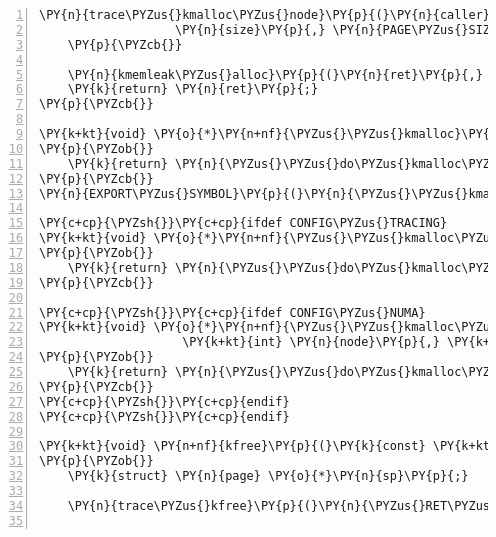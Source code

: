 \begin{Verbatim}[commandchars=\\\{\},numbers=left,firstnumber=1,stepnumber=1]
		\PY{n}{trace\PYZus{}kmalloc\PYZus{}node}\PY{p}{(}\PY{n}{caller}\PY{p}{,} \PY{n}{ret}\PY{p}{,}
				   \PY{n}{size}\PY{p}{,} \PY{n}{PAGE\PYZus{}SIZE} \PY{o}{\PYZlt{}}\PY{o}{\PYZlt{}} \PY{n}{order}\PY{p}{,} \PY{n}{gfp}\PY{p}{,} \PY{n}{node}\PY{p}{)}\PY{p}{;}
	\PY{p}{\PYZcb{}}

	\PY{n}{kmemleak\PYZus{}alloc}\PY{p}{(}\PY{n}{ret}\PY{p}{,} \PY{n}{size}\PY{p}{,} \PY{l+m+mi}{1}\PY{p}{,} \PY{n}{gfp}\PY{p}{)}\PY{p}{;}
	\PY{k}{return} \PY{n}{ret}\PY{p}{;}
\PY{p}{\PYZcb{}}

\PY{k+kt}{void} \PY{o}{*}\PY{n+nf}{\PYZus{}\PYZus{}kmalloc}\PY{p}{(}\PY{k+kt}{size\PYZus{}t} \PY{n}{size}\PY{p}{,} \PY{k+kt}{gfp\PYZus{}t} \PY{n}{gfp}\PY{p}{)}
\PY{p}{\PYZob{}}
	\PY{k}{return} \PY{n}{\PYZus{}\PYZus{}do\PYZus{}kmalloc\PYZus{}node}\PY{p}{(}\PY{n}{size}\PY{p}{,} \PY{n}{gfp}\PY{p}{,} \PY{n}{NUMA\PYZus{}NO\PYZus{}NODE}\PY{p}{,} \PY{n}{\PYZus{}RET\PYZus{}IP\PYZus{}}\PY{p}{)}\PY{p}{;}
\PY{p}{\PYZcb{}}
\PY{n}{EXPORT\PYZus{}SYMBOL}\PY{p}{(}\PY{n}{\PYZus{}\PYZus{}kmalloc}\PY{p}{)}\PY{p}{;}

\PY{c+cp}{\PYZsh{}}\PY{c+cp}{ifdef CONFIG\PYZus{}TRACING}
\PY{k+kt}{void} \PY{o}{*}\PY{n+nf}{\PYZus{}\PYZus{}kmalloc\PYZus{}track\PYZus{}caller}\PY{p}{(}\PY{k+kt}{size\PYZus{}t} \PY{n}{size}\PY{p}{,} \PY{k+kt}{gfp\PYZus{}t} \PY{n}{gfp}\PY{p}{,} \PY{k+kt}{unsigned} \PY{k+kt}{long} \PY{n}{caller}\PY{p}{)}
\PY{p}{\PYZob{}}
	\PY{k}{return} \PY{n}{\PYZus{}\PYZus{}do\PYZus{}kmalloc\PYZus{}node}\PY{p}{(}\PY{n}{size}\PY{p}{,} \PY{n}{gfp}\PY{p}{,} \PY{n}{NUMA\PYZus{}NO\PYZus{}NODE}\PY{p}{,} \PY{n}{caller}\PY{p}{)}\PY{p}{;}
\PY{p}{\PYZcb{}}

\PY{c+cp}{\PYZsh{}}\PY{c+cp}{ifdef CONFIG\PYZus{}NUMA}
\PY{k+kt}{void} \PY{o}{*}\PY{n+nf}{\PYZus{}\PYZus{}kmalloc\PYZus{}node\PYZus{}track\PYZus{}caller}\PY{p}{(}\PY{k+kt}{size\PYZus{}t} \PY{n}{size}\PY{p}{,} \PY{k+kt}{gfp\PYZus{}t} \PY{n}{gfp}\PY{p}{,}
					\PY{k+kt}{int} \PY{n}{node}\PY{p}{,} \PY{k+kt}{unsigned} \PY{k+kt}{long} \PY{n}{caller}\PY{p}{)}
\PY{p}{\PYZob{}}
	\PY{k}{return} \PY{n}{\PYZus{}\PYZus{}do\PYZus{}kmalloc\PYZus{}node}\PY{p}{(}\PY{n}{size}\PY{p}{,} \PY{n}{gfp}\PY{p}{,} \PY{n}{node}\PY{p}{,} \PY{n}{caller}\PY{p}{)}\PY{p}{;}
\PY{p}{\PYZcb{}}
\PY{c+cp}{\PYZsh{}}\PY{c+cp}{endif}
\PY{c+cp}{\PYZsh{}}\PY{c+cp}{endif}

\PY{k+kt}{void} \PY{n+nf}{kfree}\PY{p}{(}\PY{k}{const} \PY{k+kt}{void} \PY{o}{*}\PY{n}{block}\PY{p}{)}
\PY{p}{\PYZob{}}
	\PY{k}{struct} \PY{n}{page} \PY{o}{*}\PY{n}{sp}\PY{p}{;}

	\PY{n}{trace\PYZus{}kfree}\PY{p}{(}\PY{n}{\PYZus{}RET\PYZus{}IP\PYZus{}}\PY{p}{,} \PY{n}{block}\PY{p}{)}\PY{p}{;}


\end{Verbatim}
